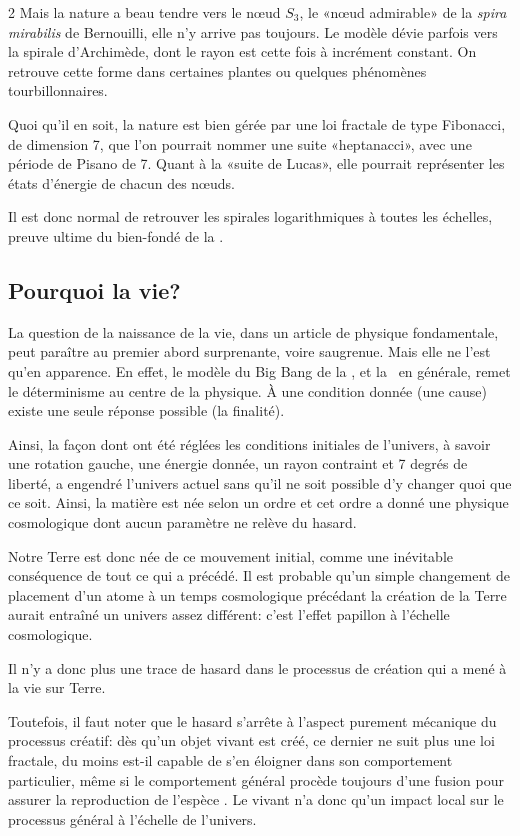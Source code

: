 \begin{multicols}{2}
Mais la nature a beau tendre vers le nœud $S_3$, le «nœud admirable» de la \textit{spira mirabilis} de Bernouilli, elle n'y arrive pas toujours. Le modèle dévie parfois vers la spirale d'Archimède, dont le rayon est cette fois à incrément constant. On retrouve cette forme dans certaines plantes ou quelques phénomènes tourbillonnaires.

Quoi qu'il en soit, la nature est bien gérée par une loi fractale de type Fibonacci, de dimension 7, que l'on pourrait nommer une suite «heptanacci», avec une période de Pisano de 7. Quant à la «suite de Lucas», elle pourrait représenter les états d'énergie de chacun des nœuds. 

Il est donc normal de retrouver les spirales logarithmiques à toutes les échelles, preuve ultime du bien-fondé de la \PQ. 

\subsection{Pourquoi la vie?}

La question de la naissance de la vie, dans un article de physique
fondamentale, peut paraître au premier abord surprenante, voire saugrenue. Mais elle ne l'est qu'en
apparence. En effet, le modèle du Big Bang de la \PQ, et la \PQ\ en
générale, remet le déterminisme au centre de la physique. À une
condition donnée (une cause) existe une seule réponse possible (la
finalité).

Ainsi, la façon dont ont été réglées les conditions initiales de
l'univers, à savoir une rotation gauche, une énergie donnée, un rayon
contraint et 7 degrés de liberté, a engendré l'univers actuel sans qu'il
ne soit possible d'y changer quoi que ce soit. Ainsi, la matière est
née selon un ordre et cet ordre a donné une physique cosmologique dont
aucun paramètre ne relève du hasard.

Notre Terre est donc née de ce mouvement initial, comme une inévitable
conséquence de tout ce qui a précédé. Il est probable qu'un simple
changement de placement d'un atome à un temps cosmologique précédant
la création de la Terre aurait entraîné un univers assez différent:
c'est l'effet papillon à l'échelle cosmologique.

Il n'y a donc plus une trace de hasard dans le processus de création
qui a mené à la vie sur Terre.

Toutefois, il faut noter que le hasard s'arrête à l'aspect purement
mécanique du processus créatif: dès qu'un objet vivant est créé, ce
dernier ne suit plus une loi fractale, du moins est-il capable de s'en
éloigner dans son comportement particulier, même si le comportement
général procède toujours d'une fusion pour assurer la reproduction de
l'espèce \cite{queirosconde2003entropie}.
Le vivant n'a donc qu'un impact local sur le processus général à
l'échelle de l'univers.


\end{multicols}
